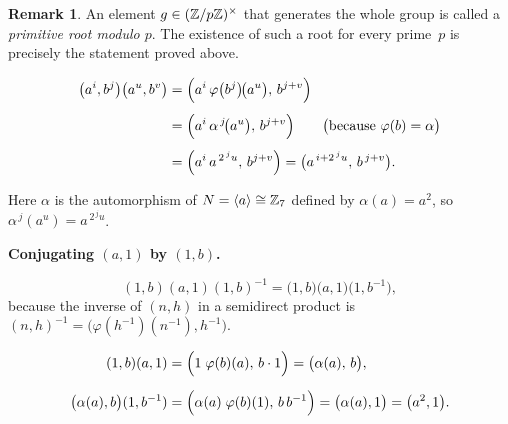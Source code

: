 \documentclass[12pt]{article}
\theoremstyle{definition} %
\newtheorem{remark}{Remark}
\theoremstyle{plain} %
\begin{document}
      \begin{remark}
      An element $g\in(\Bbb Z/p\Bbb Z)^{\times}$ that generates the whole
      group is called a \emph{primitive root modulo $p$}.
      The existence of such a root for every prime~$p$ is precisely
      the statement proved above.
      \end{remark}
      \begin{align*}
        \bigl(a^{i},b^{j}\bigr)\bigl(a^{u},b^{v}\bigr)
            &=\Bigl(a^{i}\,\varphi\bigl(b^{j}\bigr)\!\bigl(a^{u}\bigr),\,b^{j+v}\Bigr) \\[4pt]
            &=\Bigl(a^{i}\,\alpha^{\,j}\!\bigl(a^{u}\bigr),\,b^{j+v}\Bigr)
               \qquad\bigl(\text{because }\varphi(b)=\alpha\bigr) \\[4pt]
            &=\Bigl(a^{i}\,a^{\,2^{\,j}u},\,b^{j+v}\Bigr)     %
               =\bigl(a^{\,i+2^{\,j}u},\,b^{\,j+v}\bigr).
        \end{align*}
        
        Here $\alpha$ is the automorphism of $N=\langle a\rangle\cong\Bbb Z_{7}$
        defined by $\alpha(a)=a^{2}$, so
        $\alpha^{\,j}(a^{u})=a^{\,2^{\,j}u}$.
        
        \bigskip
        \textbf{Conjugating $(a,1)$ by $(1,b)$.}
        
        \[
           (1,b)(a,1)(1,b)^{-1}
           =\bigl(1,b\bigr)\bigl(a,1\bigr)\bigl(1,b^{-1}\bigr),
        \]
        because the inverse of $(n,h)$ in a semidirect product is
        \(
           (n,h)^{-1}=\bigl(\varphi(h^{-1})(n^{-1}),h^{-1}\bigr).
        \)
        
        \begin{align*}
        (1,b)(a,1)
           &=\Bigl(1\;\varphi(b)(a),\,b\cdot1\Bigr)
             =\bigl(\alpha(a),\,b\bigr), \\[6pt]
        \bigl(\alpha(a),b\bigr)(1,b^{-1})
           &=\Bigl(\alpha(a)\;\varphi(b)(1),\,b\,b^{-1}\Bigr)
             =\bigl(\alpha(a),1\bigr)
             =\bigl(a^{2},1\bigr).
        \end{align*}
        
\end{document}
